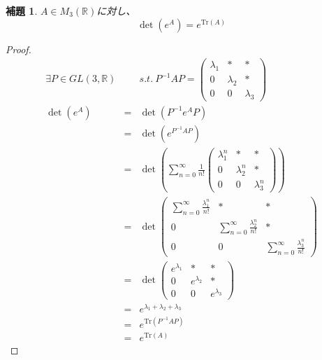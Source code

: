 \documentclass[10pt]{jarticle}
\newtheorem{Lem}{補題}[section]
\begin{document}
\begin{Lem} \label{lem:detTr}
    $A \in M_3(\mathbb{R})$に対し、
    \begin{equation}
        \det(e^A) = e^{\mathrm{Tr}(A)}
    \end{equation}
\end{Lem}

\begin{proof}
    \begin{eqnarray}
        \exists P\in GL(3,\mathbb{R})&&  s.t. \ 
        P^{-1}AP=
        \left(
          \begin{array}{ccc}
              \lambda_1 & * & * \\
              0 & \lambda_2 & * \\
              0 & 0 & \lambda_3
          \end{array}
        \right) \\
        \det(e^A)&=&\det(P^{-1}e^AP) \\
        &=&\det(e^{P^{-1}AP}) \\
        &=&\det(\sum_{n=0}^{\infty}\frac{1}{n!}
        \left(
          \begin{array}{ccc}
              \lambda_1^n & * & * \\
              0 & \lambda_2^n & * \\
              0 & 0 & \lambda_3^n
          \end{array}
        \right)
        ) \\
        &=&\det
        \left(
          \begin{array}{ccc}
              \sum_{n=0}^{\infty}\frac{\lambda_1^n}{n!} & * & * \\
              0 & \sum_{n=0}^{\infty}\frac{\lambda_2^n}{n!} & * \\
              0 & 0 & \sum_{n=0}^{\infty}\frac{\lambda_3^n}{n!}
          \end{array}
        \right) \\
        &=&\det
        \left(
          \begin{array}{ccc}
              e^{\lambda_1} & * & * \\
              0 & e^{\lambda_2} & * \\
              0 & 0 & e^{\lambda_3}
          \end{array}
        \right) \\
        &=&e^{\lambda_1+\lambda_2+\lambda_3} \\
        &=&e^{\mathrm{Tr}(P^{-1}AP)} \\
        &=&e^{\mathrm{Tr}(A)}
    \end{eqnarray}
\end{proof}
\end{document}
